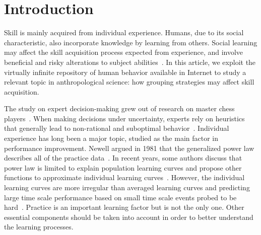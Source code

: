 \documentclass[a4paper,10pt]{book}
\theoremstyle{definition}
\begin{document}
\section{Introduction}


Skill is mainly acquired from individual experience. 
Humans, due to its social characteristic, also incorporate knowledge by learning from others.
Social learning may affect the skill acquisition process expected from experience, and involve beneficial and risky alterations to subject abilities~\cite{Boyd2011}.
In this article, we exploit the virtually infinite repository of human behavior available in Internet to study a relevant topic in anthropological science: how grouping strategies may affect skill acquisition.

The study on expert decision-making grew out of research on master chess players~\cite{deGroot1978-thoughtAndChoiceInChess,chase1973-perceptionInChess,simon1974-howBigIsAChunk}.
When making decisions under uncertainty, experts rely on heuristics that generally lead to non-rational and suboptimal behavior~\cite{tversky1975-judgmentUnderUncertaintyHeuristicsAndBiases,kahneman1979-decisionUnderRisk}.
Individual experience has long been a major topic, studied as the main factor in performance improvement.
Newell argued in 1981 that the generalized power law describes all of the practice data~\cite{Newell1981}.
In recent years, some authors discuss that power law is limited to explain population learning curves and propose other functions to approximate individual learning curves~\cite{heathcote2000-powerLawRepealedExponentialLawOfPractice}.
However, the individual learning curves are more irregular than averaged learning curves and predicting large time scale performance based on small time scale events probed to be hard~\cite{howard2014-learningCurvesChessPlayersATestOfPowerLawGenerality}.
Practice is an important learning factor but is not the only one.
Other essential components should be taken into account in order to better understand the learning processes.
\end{document}
